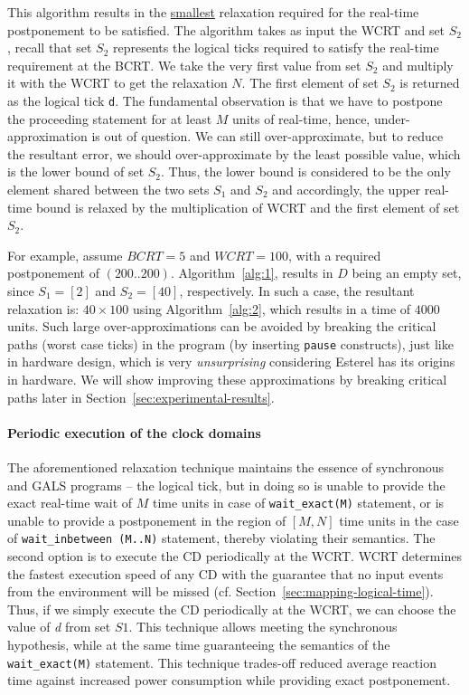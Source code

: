 This algorithm results in the \underline{smallest} relaxation required
for the real-time postponement to be satisfied. The algorithm takes as
input the WCRT and set $S_2$, recall that set $S_2$ represents the
logical ticks required to satisfy the real-time requirement at the
BCRT. We take the very first value from set $S_2$ and multiply it with
the WCRT to get the relaxation $N$. The first element of set $S_2$ is
returned as the logical tick \texttt{d}. The fundamental observation is
that we have to postpone the proceeding statement for at least $M$ units
of real-time, hence, under-approximation is out of question. We can
still over-approximate, but to reduce the resultant error, we should
over-approximate by the least possible value, which is the lower bound
of set $S_2$. Thus, the lower bound is considered to be the only element
shared between the two sets $S_1$ and $S_2$ and accordingly, the upper
real-time bound is relaxed by the multiplication of WCRT and the first
element of set $S_2$.

For example, assume $BCRT=5$ and $WCRT=100$, with a required
postponement of $(200..200)$. Algorithm~\ref{alg:1}, results in $D$
being an empty set, since $S_1=[2]$ and $S_2=[40]$, respectively. In
such a case, the resultant relaxation is: $40 \times 100$ using
Algorithm~\ref{alg:2}, which results in a time of $4000$ units. Such
large over-approximations can be avoided by breaking the critical paths
(worst case ticks) in the program (by inserting \texttt{pause}
constructs), just like in hardware design, which is very
\textit{unsurprising} considering Esterel has its origins in hardware.
We will show improving these approximations by breaking critical paths
later in Section~\ref{sec:experimental-results}.


\paragraph{Periodic execution of the clock domains}
\label{sec:peri-exec-clock}

The aforementioned relaxation technique maintains the essence of
synchronous and GALS programs -- the logical tick, but in doing so is
unable to provide the exact real-time wait of $M$ time units in case of
\texttt{wait\_exact(M)} statement, or is unable to provide a
postponement in the region of $[M, N]$ time units in the case of
\texttt{wait\_inbetween (M..N)} statement, thereby violating their
semantics. The second option is to execute the CD periodically at the
WCRT. WCRT determines the fastest execution speed of any CD with the
guarantee that no input events from the environment will be missed
(cf. Section~\ref{sec:mapping-logical-time}). Thus, if we simply execute
the CD periodically at the WCRT, we can choose the value of \textit{d}
from set $S1$. This technique allows meeting the synchronous hypothesis,
while at the same time guaranteeing the semantics of the
\texttt{wait\_exact(M)} statement. This technique trades-off reduced
average reaction time against increased power consumption while
providing exact postponement.

